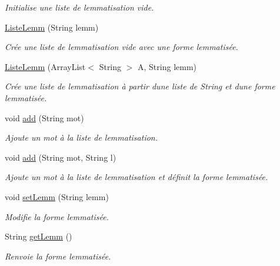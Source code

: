 \begin{DoxyCompactItemize}
\begin{DoxyCompactList}\small\item\em Initialise une liste de lemmatisation vide. \end{DoxyCompactList}\item 
\hyperlink{classlistelemm_1_1_liste_lemm_a1cce35ae2082788ead8dbab2d0017264}{Liste\+Lemm} (String lemm)
\begin{DoxyCompactList}\small\item\em Crée une liste de lemmatisation vide avec une forme lemmatisée. \end{DoxyCompactList}\item 
\hyperlink{classlistelemm_1_1_liste_lemm_ac47048ecfbff5b2b87cb9f8890bdf738}{Liste\+Lemm} (Array\+List$<$ String $>$ A, String lemm)
\begin{DoxyCompactList}\small\item\em Crée une liste de lemmatisation à partir d\textquotesingle{}une liste de String et d\textquotesingle{}une forme lemmatisée. \end{DoxyCompactList}\item 
void \hyperlink{classlistelemm_1_1_liste_lemm_a09713daba81bd6d6f1767c7c4a2d3516}{add} (String mot)
\begin{DoxyCompactList}\small\item\em Ajoute un mot à la liste de lemmatisation. \end{DoxyCompactList}\item 
void \hyperlink{classlistelemm_1_1_liste_lemm_ad2b07c433c41ca0d496d8e3547665be5}{add} (String mot, String l)
\begin{DoxyCompactList}\small\item\em Ajoute un mot à la liste de lemmatisation et définit la forme lemmatisée. \end{DoxyCompactList}\item 
void \hyperlink{classlistelemm_1_1_liste_lemm_a221583b199fa193fcb0611db00992989}{set\+Lemm} (String lemm)
\begin{DoxyCompactList}\small\item\em Modifie la forme lemmatisée. \end{DoxyCompactList}\item 
String \hyperlink{classlistelemm_1_1_liste_lemm_a26435dc44d5030955559a751ca7b334b}{get\+Lemm} ()
\begin{DoxyCompactList}\small\item\em Renvoie la forme lemmatisée. \end{DoxyCompactList}\item 

\end{DoxyCompactItemize}
